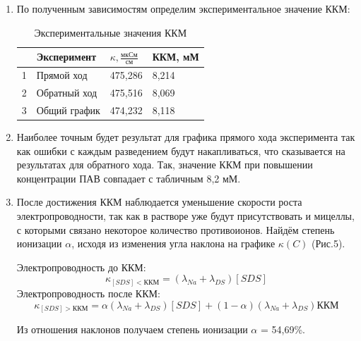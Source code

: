 \documentclass[a4paper, 11pt]{article}%
\begin{document}
\begin{enumerate}
\begin{figure}[!htb]
        \endminipage
    \end{figure}
    \item По полученным зависимостям определим экспериментальное значение ККМ:
    \begin{table}[h!]
    \centering
    \caption{Экспериментальные значения ККМ}
    \begin{tabular}{|l|l|l|l|}
    \hline
    & Эксперимент  & $\kappa, \frac{\text{мкСм}}{\text{см}}$ &  ККМ, мМ    \\
    \hline
    1& Прямой ход & 475,286 & 8,214   \\
    \hline
    2& Обратный ход  & 475,516 & 8,069  \\
    \hline
    3& Общий график  & 474,232 & 8,118 \\ 
    \hline
    \end{tabular}
    \end{table}
    \item Наиболее точным будет результат для графика прямого хода эксперимента так как ошибки с каждым разведением будут накапливаться, что сказывается на результатах для обратного хода. Так, значение ККМ при повышении концентрации ПАВ совпадает с табличным 8,2 мМ. 
    \item После достижения ККМ наблюдается уменьшение скорости роста электропроводности, так как в растворе уже будут присутствовать и мицеллы, с которыми связано некоторое количество противоионов. Найдём степень ионизации $\alpha$, исходя из изменения угла наклона на графике $\kappa(C)$ (Рис.5).

    Электропроводность до ККМ:
    $$ \kappa_{[SDS] < \text{ККМ}} = (\lambda_{Na}+\lambda_{DS})[SDS] $$
    Электропроводность после ККМ:
    $$ \kappa_{[SDS] > \text{ККМ}} = \alpha (\lambda_{Na}+\lambda_{DS})[SDS] + (1 - \alpha) (\lambda_{Na}+\lambda_{DS})\text{ККМ}$$
    
    Из отношения наклонов получаем степень ионизации $\alpha$ = 54,69\%.
    
\end{enumerate}
\newpage
\end{document}
